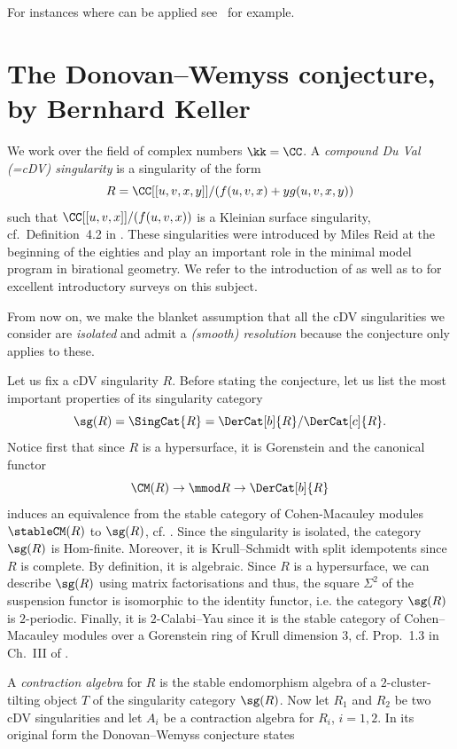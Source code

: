 \documentclass[a4paper]{amsart}
\begin{document}
For instances where  can be applied
see~\cite{McM20,Xin23} for example.

\appendix

\section{The Donovan--Wemyss conjecture, by Bernhard Keller}
We work over the field of complex numbers $\kk=\CC$.
A {\em compound Du Val (=cDV) singularity} is a singularity of the form
\[
R=\CC[[u,v,x,y]]/(f(u,v,x)+y g(u,v,x,y))
\]
such that $\CC[[u,v,x]]/(f(u,v,x))$ is a Kleinian surface singularity,
cf.~Definition~4.2 in \cite{Aug20a}. These singularities were introduced by
Miles Reid \cite{Reid81} at the beginning of the eighties and play an important
role in the minimal model program in birational geometry. We refer to the
introduction of \cite{August19} as well as to \cite{Wem23} for excellent
introductory surveys on this subject.

From now on, we make the blanket assumption that all the cDV singularities
we consider are {\em isolated} and admit a \emph{(smooth) resolution} because the conjecture only applies to these.

Let us fix a cDV singularity $R$. Before stating the conjecture, let us list
the most important properties of its singularity category
\[
\sg(R)=\SingCat{R}=\DerCat[b]{R}/\DerCat[c]{R}.
\]
Notice first that since $R$ is a hypersurface, it is Gorenstein and the canonical functor 
\[
\CM(R) \to\mmod R \to  \DerCat[b]{R}
\]
induces an equivalence from the stable category of Cohen-Macauley modules
$\stableCM(R)$ to $\sg(R)$, cf. \cite{Buc21}. Since the singularity is isolated, the
category $\sg(R)$ is  $\mathrm{Hom}$-finite. Moreover,
it is Krull--Schmidt with split idempotents since $R$ is complete. By definition, it is algebraic.
Since $R$ is a hypersurface, we can describe $\sg(R)$ using matrix factorisations
and thus, the square $\Sigma^2$ of the suspension functor is isomorphic
to the identity functor, i.e. the category $\sg(R)$ is $2$-periodic.
Finally, it is $2$-Calabi--Yau since it is the
stable category of Cohen--Macauley modules over a Gorenstein
ring of Krull dimension $3$, cf. Prop.~1.3 in Ch.~III of \cite{Auslander76}. 

A {\em contraction algebra} for $R$ is \cite{DW16, Wem18} the stable
endomorphism algebra of a $2$-cluster-tilting object $T$ of the singularity category  $\sg(R)$.
Now let $R_1$ and $R_2$ be two cDV singularities and let $A_i$ be
a contraction algebra for $R_i$, $i=1,2$. In its original form
the Donovan--Wemyss conjecture states
\end{document}
